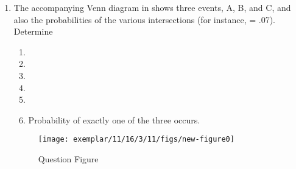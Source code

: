 \begin{enumerate}[label=\thesection.\arabic*,ref=\thesection.\theenumi]
	\item The accompanying Venn diagram in 
		shows three events, A, B, and C, and also the probabilities of the various intersections (for instance,  = .07). Determine
\begin{enumerate}
\item 
{}
\item 
{}
\item 
{}
\item 
{}
\item 
{}
\item 
Probability of exactly one
of the three occurs.
\end{enumerate}
\begin{figure}[h!]
	\centering
	\texttt{[image: exemplar/11/16/3/11/figs/new-figure0]}
\caption{Question Figure}
\label{fig:exemplar/11/16/3/11/Venn_Diagram}
\end{figure}
		\solution
		
\end{enumerate}

